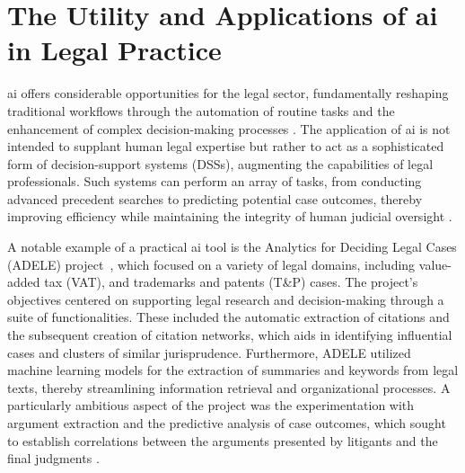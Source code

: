 
\section{The Utility and Applications of \ac{ai} in Legal Practice}

\ac{ai} offers considerable opportunities for the legal sector, fundamentally reshaping traditional workflows through the automation of routine tasks and the enhancement of complex decision-making processes \cite{juliahb2024}. The application of \ac{ai} is not intended to supplant human legal expertise but rather to act as a sophisticated form of decision-support systems (DSSs), augmenting the capabilities of legal professionals. Such systems can perform an array of tasks, from conducting advanced precedent searches to predicting potential case outcomes, thereby improving efficiency while maintaining the integrity of human judicial oversight \cite{juliahb2024}.

A notable example of a practical \ac{ai} tool is the Analytics for Deciding Legal Cases (ADELE) project~\cite{galli2024analytics}, which focused on a variety of legal domains, including value-added tax (VAT), and trademarks and patents (T\&P) cases. The project's objectives centered on supporting legal research and decision-making through a suite of functionalities. These included the automatic extraction of citations and the subsequent creation of citation networks, which aids in identifying influential cases and clusters of similar jurisprudence. Furthermore, ADELE utilized machine learning models for the extraction of summaries and keywords from legal texts, thereby streamlining information retrieval and organizational processes. A particularly ambitious aspect of the project was the experimentation with argument extraction and the predictive analysis of case outcomes, which sought to establish correlations between the arguments presented by litigants and the final judgments \cite{juliahb2024}.

